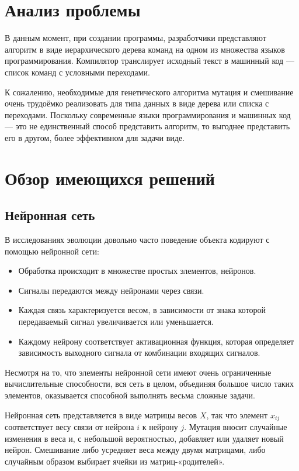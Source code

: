 \documentclass[utf8,a5paper,portrait,10pt,twoside]{eskdtext}
\begin{document}
\section{Анализ проблемы}

В данным момент, при создании программы, разработчики представляют алгоритм в
виде иерархического дерева команд на одном из множества языков программирования.
Компилятор транслирует исходный текст в машинный код — список команд с условными
переходами.

К сожалению, необходимые для генетического алгоритма мутация и смешивание очень
трудоёмко реализовать для типа данных в виде дерева или списка с переходами.
Поскольку современные языки программирования и машинных код — это не
единственный способ представить алгоритм, то выгоднее представить его в другом,
более эффективном для задачи виде.

\newpage
\section{Обзор имеющихся решений}

\subsection{Нейронная сеть}

В исследованиях эволюции\cite{communication} довольно часто поведение объекта 
кодируют с помощью нейронной сети:\cite{neural}
\begin{itemize}
  \item Обработка происходит в множестве простых элементов, нейронов.
  \item Сигналы передаются между нейронами через связи.
  \item Каждая связь характеризуется весом, в зависимости от знака которой
        передаваемый сигнал увеличивается или уменьшается.
  \item Каждому нейрону соответствует активационная функция, которая определяет 
        зависимость выходного сигнала от комбинации входящих сигналов.
\end{itemize}

Несмотря на то, что элементы нейронной сети имеют очень ограниченные
вычислительные способности, вся сеть в целом, объединяя большое число таких
элементов, оказывается способной выполнять весьма сложные задачи.

Нейронная сеть представляется в виде матрицы весов $X$, так что элемент
$x_{ij}$ соответствует весу связи от нейрона $i$ к нейрону $j$. Мутация
вносит случайные изменения в веса и, с небольшой вероятностью, добавляет или
удаляет новый нейрон. Смешивание либо усредняет веса между двумя матрицами, либо
случайным образом выбирает ячейки из матриц-«родителей».
\end{document}
